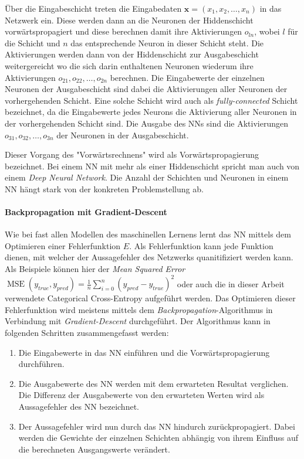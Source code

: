 Über die Eingabeschicht treten die Eingabedaten $\mathbf{x} = (x_1, x_2, \dots, x_n)$ in das Netzwerk ein. Diese werden dann an die Neuronen der Hiddenschicht vorwärtspropagiert und diese berechnen damit ihre Aktivierungen $o_{ln}$, wobei $l$ für die Schicht und $n$ das entsprechende Neuron in dieser Schicht steht. Die Aktivierungen werden dann von der Hiddenschicht zur Ausgabeschicht weitergereicht wo die sich darin enthaltenen Neuronen wiederum ihre Aktivierungen $o_{21}, o_{22}, \dots, o_{2n}$ berechnen. Die Eingabewerte der einzelnen Neuronen der Ausgabeschicht sind dabei die Aktivierungen aller Neuronen der vorhergehenden Schicht. Eine solche Schicht wird auch als \emph{fully-connected} Schicht bezeichnet, da die Eingabewerte jedes Neurons die Aktivierung aller Neuronen in der vorhergehenden Schicht sind. Die Ausgabe des NNs sind die Aktivierungen $o_{31}, o_{32}, \dots, o_{3n}$ der Neuronen in der Ausgabeschicht.

Dieser Vorgang des "Vorwärtsrechnens" wird als Vorwärtspropagierung bezeichnet. Bei einem NN mit mehr als einer Hiddenschicht spricht man auch von einem \emph{Deep Neural Network}. Die Anzahl der Schichten und Neuronen in einem NN hängt stark von der konkreten Problemstellung ab.

\paragraph{Backpropagation mit Gradient-Descent} Wie bei fast allen Modellen des maschinellen Lernens lernt das NN mittels dem Optimieren einer Fehlerfunktion $E$. Als Fehlerfunktion kann jede Funktion dienen, mit welcher der Aussagefehler des Netzwerks quanitifiziert werden kann. Als Beispiele können hier der \emph{Mean Squared Error} $\operatorname{MSE}(y_{true}, y_{pred}) = \frac{1}{n}\sum_{i=0}^{n} (y_{pred} - y_{true})^2$ oder auch die in dieser Arbeit verwendete Categorical Cross-Entropy  aufgeführt werden. Das Optimieren dieser Fehlerfunktion wird meistens mittels dem \emph{Backpropagation}-Algorithmus in Verbindung mit \emph{Gradient-Descent} durchgeführt. Der Algorithmus kann in folgenden Schritten zusammengefasst werden:

\begin{enumerate}
  \item Die Eingabewerte in das NN einführen und die Vorwärtspropagierung durchführen.
  \item Die Ausgabewerte des NN werden mit dem erwarteten Resultat verglichen. Die Differenz der Ausgabewerte von den erwarteten Werten wird als Aussagefehler des NN bezeichnet.
  \item Der Aussagefehler wird nun durch das NN hindurch zurückpropagiert. Dabei werden die Gewichte der einzelnen Schichten abhängig von ihrem Einfluss auf die berechneten Ausgangswerte verändert.
\end{enumerate}

